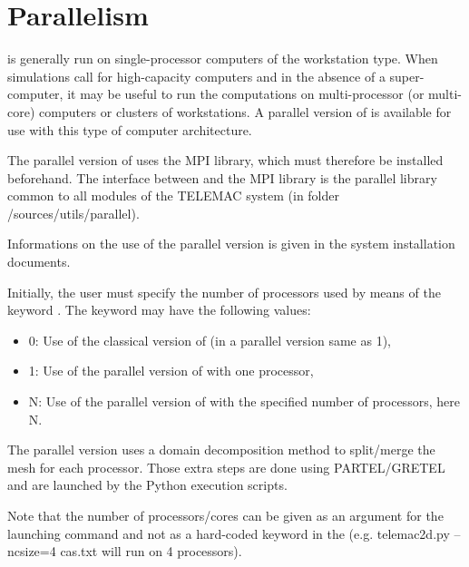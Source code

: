 \chapter{Parallelism}
\label{ch:paral}
 is generally run on single-processor computers of the workstation
type.
When simulations call for high-capacity computers and in the absence of a
super-computer, it may be useful to run the computations on multi-processor
(or multi-core) computers or clusters of workstations.
A parallel version of  is available for use with this type of
computer architecture.

The parallel version of  uses the MPI library, which must therefore
be installed beforehand.
The interface between  and the MPI library is the parallel library
common to all modules of the TELEMAC system (in folder /sources/utils/parallel).

Informations on the use of the parallel version is given in the system
installation documents.

Initially, the user must specify the number of processors used by means of the
keyword .
The keyword may have the following values:

\begin{itemize}
\item 0: Use of the classical version of 
(in a parallel version same as 1),

\item 1: Use of the parallel version of  with one processor,

\item N: Use of the parallel version of  with the specified number
of processors, here N.
\end{itemize}

The parallel version uses a domain decomposition method to split/merge the mesh
for each processor.
Those extra steps are done using PARTEL/GRETEL and are launched by the Python
execution scripts.

Note that the number of processors/cores can be given as an argument for the
launching command and not as a hard-coded keyword in the 
(e.g. telemac2d.py --ncsize=4 cas.txt will run  on 4 processors).
